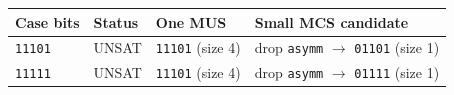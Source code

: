 \begingroup
\centering
\scriptsize
\renewcommand{\arraystretch}{1.15}
\begin{tabular}{llll}
\toprule
Case bits & Status & One MUS & Small MCS candidate \\
\midrule
\texttt{11101} & UNSAT & \texttt{11101} (size 4) & drop \texttt{asymm} $\rightarrow$ \texttt{01101} (size 1) \\
\texttt{11111} & UNSAT & \texttt{11101} (size 4) & drop \texttt{asymm} $\rightarrow$ \texttt{01111} (size 1) \\
\bottomrule
\end{tabular}
\endgroup
